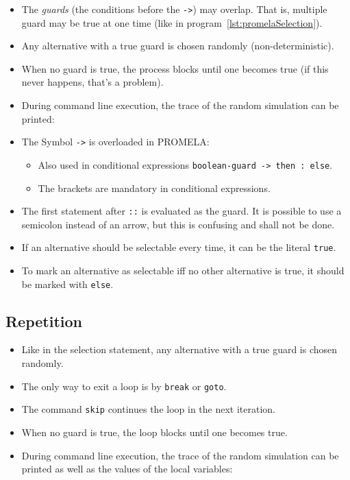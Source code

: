 \documentclass[a4paper, 11pt, accentcolor = tud3b]{tudreport}
\newcommand{\outputlisting}[1]{}
\newcommand{\inlinePromela}[1]{\lstinline[language = PROMELA]|#1|}
\begin{document}
				\begin{itemize}
					\item The \textit{guards} (the conditions before the \inlinePromela{->}) may overlap. That is, multiple guard may be true at one time (like in program~\ref{lst:promelaSelection}).
					\item Any alternative with a true guard is chosen randomly (non-deterministic).
					\item When no guard is true, the process blocks until one becomes true (if this never happens, that's a problem).
					\item During command line execution, the trace of the random simulation can be printed:
						\outputlisting{code/promela/selection.pml.out}
					\item The Symbol \inlinePromela{->} is overloaded in PROMELA:
					\begin{itemize}
						\item Also used in conditional expressions \inlinePromela{boolean-guard -> then : else}.
						\item The brackets are mandatory in conditional expressions.
					\end{itemize}
					\item The first statement after \inlinePromela{::} is evaluated as the guard. It is possible to use a semicolon instead of an arrow, but this is confusing and shall not be done.
					\item If an alternative should be selectable every time, it can be the literal \inlinePromela{true}.
					\item To mark an alternative as selectable iff no other alternative is true, it should be marked with \inlinePromela{else}.
				\end{itemize}

			\subsection{Repetition}
				
				
				\begin{itemize}
					\item Like in the selection statement, any alternative with a true guard is chosen randomly.
					\item The only way to exit a loop is by \inlinePromela{break} or \inlinePromela{goto}.
					\item The command \inlinePromela{skip} continues the loop in the next iteration.
					\item When no guard is true, the loop blocks until one becomes true.
					\item During command line execution, the trace of the random simulation can be printed as well as the values of the local variables:
						\outputlisting{code/promela/repetition.pml.out}
				\end{itemize}
			
\end{document}
